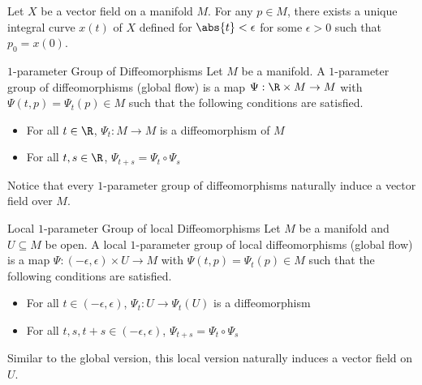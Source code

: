 \documentclass[a4paper]{article}
\begin{document}
\begin{prp}{}{} Let $X$ be a vector field on a manifold $M$. For any $p\in M$, there exists a unique integral curve $x(t)$ of $X$ defined for $\abs{t}<\epsilon$ for some $\epsilon>0$ such that $p_0=x(0)$. 
\end{prp}

\begin{defn}{$1$-parameter Group of Diffeomorphisms}{} Let $M$ be a manifold. A $1$-parameter group of diffeomorphisms (global flow) is a map $\Psi:\R\times M\to M$ with $\Psi(t,p)=\Psi_t(p)\in M$ such that the following conditions are satisfied. 
\begin{itemize}
\item For all $t\in\R$, $\Psi_t:M\to M$ is a diffeomorphism of $M$
\item For all $t,s\in\R$, $\Psi_{t+s}=\Psi_t\circ\Psi_s$
\end{itemize}
\end{defn}

Notice that every $1$-parameter group of diffeomorphisms naturally induce a vector field over $M$. 

\begin{defn}{Local $1$-parameter Group of local Diffeomorphisms}{} Let $M$ be a manifold and $U\subseteq M$ be open. A local $1$-parameter group of local diffeomorphisms (global flow) is a map $\Psi:(-\epsilon,\epsilon)\times U\to M$ with $\Psi(t,p)=\Psi_t(p)\in M$ such that the following conditions are satisfied. 
\begin{itemize}
\item For all $t\in(-\epsilon,\epsilon)$, $\Psi_t:U\to\Psi_t(U)$ is a diffeomorphism
\item For all $t,s,t+s\in(-\epsilon,\epsilon)$, $\Psi_{t+s}=\Psi_t\circ\Psi_s$
\end{itemize}
\end{defn}

Similar to the global version, this local version naturally induces a vector field on $U$. 
\end{document}
